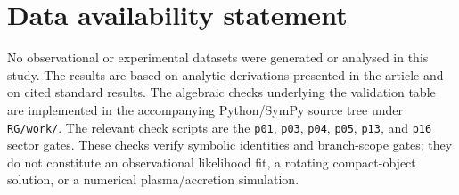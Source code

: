 \documentclass[12pt,a4paper]{article}
\begin{document}
\section*{Data availability statement}

No observational or experimental datasets were generated or analysed in this
study. The results are based on analytic derivations presented in the article
and on cited standard results.
The algebraic checks underlying the validation table are implemented in the
accompanying Python/SymPy source tree under \texttt{RG/work/}. The relevant
check scripts are the \texttt{p01}, \texttt{p03}, \texttt{p04}, \texttt{p05},
\texttt{p13}, and \texttt{p16} sector gates. These checks verify symbolic identities and
branch-scope gates; they do not constitute an observational likelihood fit, a
rotating compact-object solution, or a numerical plasma/accretion simulation.
\end{document}
